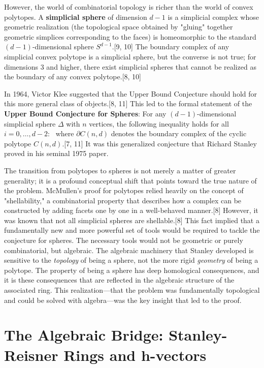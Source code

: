 \documentclass[11pt]{article}
\begin{document}
However, the world of combinatorial topology is richer than the world of convex polytopes. A \textbf{simplicial sphere} of dimension $d-1$ is a simplicial complex whose geometric realization (the topological space obtained by "gluing" together geometric simplices corresponding to the faces) is homeomorphic to the standard $(d-1)$-dimensional sphere $S^{d-1}$.[9, 10] The boundary complex of any simplicial convex polytope is a simplicial sphere, but the converse is not true; for dimensions 3 and higher, there exist simplicial spheres that cannot be realized as the boundary of any convex polytope.[8, 10]

In 1964, Victor Klee suggested that the Upper Bound Conjecture should hold for this more general class of objects.[8, 11] This led to the formal statement of the \textbf{Upper Bound Conjecture for Spheres}: For any $(d-1)$-dimensional simplicial sphere $\Delta$ with $n$ vertices, the following inequality holds for all $i=0, \ldots, d-2$:
\
where $\partial C(n,d)$ denotes the boundary complex of the cyclic polytope $C(n,d)$.[7, 11] It was this generalized conjecture that Richard Stanley proved in his seminal 1975 paper.

The transition from polytopes to spheres is not merely a matter of greater generality; it is a profound conceptual shift that points toward the true nature of the problem. McMullen's proof for polytopes relied heavily on the concept of "shellability," a combinatorial property that describes how a complex can be constructed by adding facets one by one in a well-behaved manner.[8] However, it was known that not all simplicial spheres are shellable.[8] This fact implied that a fundamentally new and more powerful set of tools would be required to tackle the conjecture for spheres. The necessary tools would not be geometric or purely combinatorial, but algebraic. The algebraic machinery that Stanley developed is sensitive to the \textit{topology} of being a sphere, not the more rigid \textit{geometry} of being a polytope. The property of being a sphere has deep homological consequences, and it is these consequences that are reflected in the algebraic structure of the associated ring. This realization—that the problem was fundamentally topological and could be solved with algebra—was the key insight that led to the proof.

\section{The Algebraic Bridge: Stanley-Reisner Rings and h-vectors}
\end{document}
